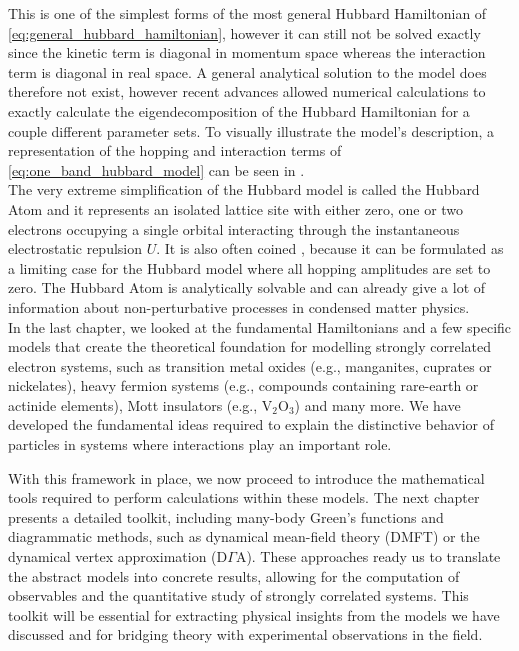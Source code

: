 \documentclass[\main/main.tex]{subfiles}
\begin{document}
This is one of the simplest forms of the most general Hubbard Hamiltonian of \eqref{eq:general_hubbard_hamiltonian}, however it can still not be solved exactly since the kinetic term is diagonal in momentum space whereas the interaction term is diagonal in real space. A general analytical solution to the model does therefore not exist, however recent advances allowed numerical calculations to exactly calculate the eigendecomposition of the Hubbard Hamiltonian for a couple different parameter sets. To visually illustrate the model's description, a representation of the hopping and interaction terms of \eqref{eq:one_band_hubbard_model} can be seen in .
\\
The very extreme simplification of the Hubbard model is called the Hubbard Atom and it represents an isolated lattice site with either zero, one or two electrons occupying a single orbital interacting through the instantaneous electrostatic repulsion $U$. It is also often coined , because it can be formulated as a limiting case for the Hubbard model where all hopping amplitudes are set to zero. The Hubbard Atom is analytically solvable and can already give a lot of information about non-perturbative processes in condensed matter physics.
\\

In the last chapter, we looked at the fundamental Hamiltonians and a few specific models that create the theoretical foundation for modelling strongly correlated electron systems, such as transition metal oxides (e.g., manganites, cuprates or nickelates), heavy fermion systems (e.g., compounds containing rare-earth or actinide elements), Mott insulators (e.g., $\text{V}_2\text{O}_3$) and many more. We have developed the fundamental ideas required to explain the distinctive behavior of particles in systems where interactions play an important role.

With this framework in place, we now proceed to introduce the mathematical tools required to perform calculations within these models. The next chapter presents a detailed toolkit, including many-body Green's functions and diagrammatic methods, such as dynamical mean-field theory (DMFT) or the dynamical vertex approximation ($\text{D}\Gamma\text{A}$). These approaches ready us to translate the abstract models into concrete results, allowing for the computation of observables and the quantitative study of strongly correlated systems. This toolkit will be essential for extracting physical insights from the models we have discussed and for bridging theory with experimental observations in the field.
\end{document}
